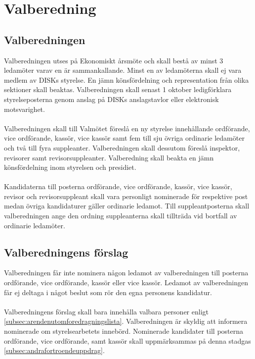 \clearpage
\section{Valberedning}
\label{sec:valberedning}

	\subsection{Valberedningen}
	\label{subsec:valberedningen}
		Valberedningen utses på Ekonomiskt årsmöte och skall bestå av minst 3 ledamöter varav en är sammankallande. Minst en av ledamöterna skall ej vara medlem av DISKs styrelse. En jämn könsfördelning och representation från olika sektioner skall beaktas. Valberedningen skall senast 1 oktober ledigförklara styrelseposterna genom anslag på DISKs anslagstavlor eller elektronisk motsvarighet.\\ \\
		Valberedningen skall till Valmötet föreslå en ny styrelse innehållande ordförande, vice ordförande, kassör, vice kassör samt fem till sju övriga ordinarie ledamöter och två till fyra suppleanter. Valberedningen skall dessutom föreslå inspektor, revisorer samt revisorsuppleanter. Valberedning skall beakta en jämn könsfördelning inom styrelsen och presidiet.\\ \\
		Kandidaterna till posterna ordförande, vice ordförande, kassör, vice kassör, revisor och revisorsuppleant skall vara personligt nominerade för respektive post medan övriga kandidaturer gäller ordinarie ledamot. Till suppleantposterna skall valberedningen ange den ordning suppleanterna skall tillträda vid bortfall av ordinarie ledamöter.

	\subsection{Valberedningens förslag}
	\label{subsec:valberedningensforslag}
		Valberedningen får inte nominera någon ledamot av valberedningen till posterna ordförande, vice ordförande, kassör eller vice kassör. Ledamot av valberedningen får ej deltaga i något beslut som rör den egna personens kandidatur.\\ \\
		Valberedningens förslag skall bara innehålla valbara personer enligt \ref{subsec:arendenutomforedragningslista}. Valberedningen är skyldig att informera nominerade om styrelsearbetets innebörd.
Nominerade kandidater till posterna ordförande, vice ordförande, samt kassör skall uppmärksammas på denna stadgas \ref{subsec:andrafortroendeuppdrag}.

